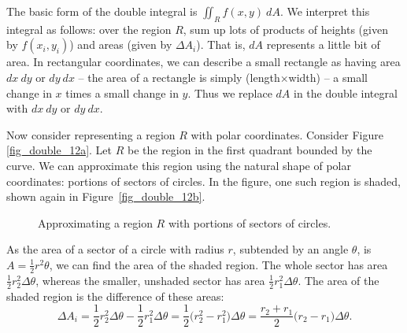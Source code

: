 The basic form of the double integral is $\iint_R f(x,y)\ dA$. We interpret this integral as follows: over the region $R$, sum up lots of products of heights (given by $f(x_i,y_i)$) and areas (given by $\Delta A_i$). That is, $dA$ represents a little bit of area. In rectangular coordinates, we can describe a small rectangle as having area $dx\ dy$ or $dy\ dx$ -- the area of a rectangle is simply (length$\times$width) -- a small change in $x$ times a small change in $y$. Thus we replace $dA$ in the double integral with $dx\ dy$ or $dy\ dx$.

Now consider representing a region $R$ with polar coordinates. Consider Figure \ref{fig_double_12a}. Let $R$ be the region in the first quadrant bounded by the curve. We can approximate this region using the natural shape of polar coordinates: portions of sectors of circles. In the figure, one such region is shaded, shown again in Figure~\ref{fig_double_12b}.

\begin{figure}
\centering
\qquad
{}
\caption{Approximating a region $R$ with portions of sectors of circles.}
\end{figure}

As the area of a sector of a circle with radius $r$, subtended by an angle $\theta$, is $A = \frac12r^2\theta$, we can find the area of the shaded region. The whole sector has area $\frac12r_2^2\Delta \theta$, whereas the smaller, unshaded sector has area $\frac12r_1^2\Delta \theta$. The area of the shaded region is the difference of these areas:
$$\Delta A_i = \frac12r_2^2\Delta\theta-\frac12r_1^2\Delta\theta = \frac12\big(r_2^2-r_1^2\big) \Delta\theta = \frac{r_2+r_1}{2}\big(r_2-r_1\big) \Delta\theta.$$

